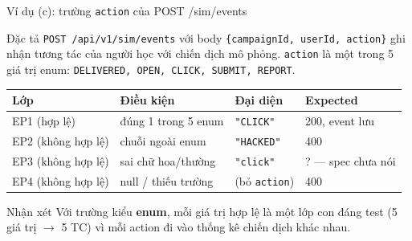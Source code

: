 \documentclass[aspectratio=169,12pt]{beamer}
\begin{document}
\begin{frame}[shrink=6]{Ví dụ (c): trường \texttt{action} của POST /sim/events}
  \begin{block}{Đặc tả}
    \texttt{POST /api/v1/sim/events} với body
    \texttt{\{campaignId, userId, action\}} ghi nhận tương tác của người học
    với chiến dịch mô phỏng. \texttt{action} là một trong 5 giá trị enum:
    \texttt{DELIVERED, OPEN, CLICK, SUBMIT, REPORT}.
  \end{block}

  \vspace{0.2em}
  \begin{center}
  \small
  \begin{tabular}{lllp{2.6cm}}
    \toprule
    \textbf{Lớp} & \textbf{Điều kiện} & \textbf{Đại diện} & \textbf{Expected} \\
    \midrule
    EP1 (hợp lệ) & đúng 1 trong 5 enum & \texttt{"CLICK"} & 200, event lưu \\
    EP2 (không hợp lệ) & chuỗi ngoài enum & \texttt{"HACKED"} & 400 \\
    EP3 (không hợp lệ) & sai chữ hoa/thường & \texttt{"click"} & ? --- spec chưa nói \\
    EP4 (không hợp lệ) & null / thiếu trường & (bỏ \texttt{action}) & 400 \\
    \bottomrule
  \end{tabular}
  \end{center}

  \vspace{0.2em}
  \begin{exampleblock}{Nhận xét}
    Với trường kiểu \textbf{enum}, mỗi giá trị hợp lệ là một lớp con đáng test
    (5 giá trị $\to$ 5 TC) vì mỗi action đi vào thống kê chiến dịch khác nhau.
  \end{exampleblock}
\end{frame}
\end{document}
